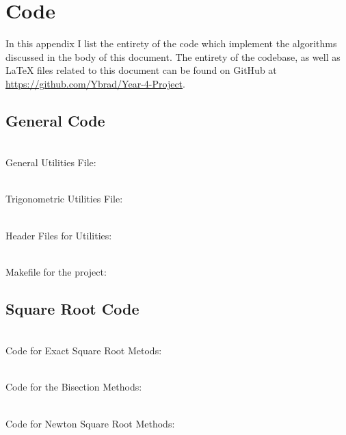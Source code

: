\section{Code}
\renewcommand{\thelstlisting}{}
\renewcommand{\lstlistingname}{File}

In this appendix I list the entirety of the code which implement the algorithms discussed in the body of this document. The entirety of the codebase, as well as LaTeX files related to this document can be found on GitHub at \url{https://github.com/Ybrad/Year-4-Project}.

\subsection{General Code}
\label{SUB_"General Code"}

\\General Utilities File:


\\Trigonometric Utilities File:


\\Header Files for Utilities:




\\Makefile for the project:


\subsection{Square Root Code}
\label{SUB_"Square Root Code"}

\\Code for Exact Square Root Metods:


\\Code for the Bisection Methods:


\\Code for Newton Square Root Methods:


